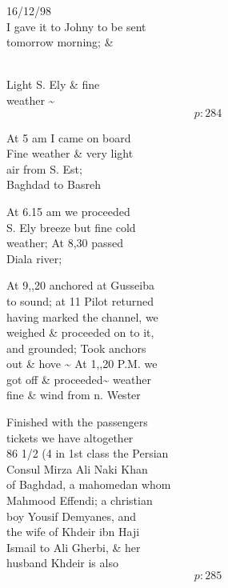 \documentclass{report}
\begin{document}
	\par{
 	16/12/98\ \\I gave it to Johny to be sent\ \\tomorrow morning; \&\ \\\ \\
	}

	\par{
 	Light S. Ely \& fine\ \\weather \~{}\ \\
  \[p: 284 \]

	}






	\par{
 	At 5 am I came on board\ \\Fine weather \& very light\ \\air from S. Est;\ \\Baghdad to Basreh\ \\
	}

	\par{
 	At 6.15 am we proceeded\ \\S. Ely breeze but fine cold\ \\weather; At 8,30 passed\ \\Diala river;\ \\
	}

	\par{
 	At 9,,20 anchored at Gusseiba\ \\to sound; at 11 Pilot returned\ \\having marked the channel, we\ \\weighed \& proceeded on to it,\ \\and grounded; Took anchors\ \\out \& hove \~{} At 1,,20 P.M. we\ \\got off \& proceeded\~{} weather\ \\fine \& wind from n. Wester\ \\
	}

	\par{
 	Finished with the passengers\ \\tickets we have altogether\ \\86 1/2 (4 in 1st class the Persian\ \\Consul Mirza Ali Naki Khan\ \\of Baghdad, a mahomedan whom\ \\Mahmood Effendi; a christian\ \\boy Yousif Demyanes, and\ \\the wife of Khdeir ibn Haji\ \\Ismail to Ali Gherbi, \& her\ \\husband Khdeir is also\ \\
  \[p: 285 \]

	}
\end{document}
